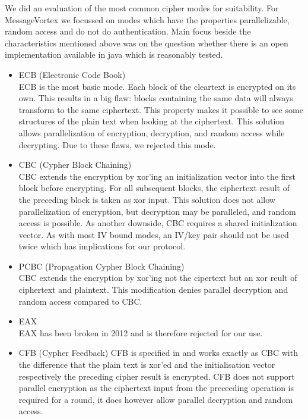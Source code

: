 We did an evaluation of the most common cipher modes for suitability. For MessageVortex we focussed on modes which have the properties parallelizable, random access and do not do authentication. Main focus beside the characteristics mentioned above was on the question whether there is an open implementation available in java which is reasonably tested.

\begin{itemize}
	\item ECB (Electronic Code Book)\\
          ECB is the most basic mode. Each block of the cleartext is encrypted on its own. This results in a big flaw: blocks containing the same data will always transform to the same ciphertext. This property makes it possible to see some structures of the plain text when looking at the ciphertext. This solution allows parallelization of encryption, decryption, and random access while decrypting. Due to these flaws, we rejected this mode.
	\item CBC (Cypher Block Chaining)\\  
          CBC extends the encryption by xor'ing an initialization vector into the first block before encrypting. For all subsequent blocks, the ciphertext result of the preceding block is taken as xor input. This solution does not allow parallelization of encryption, but decryption may be paralleled, and random access is possible. As another downside, CBC requires a shared initialization vector. As with most IV bound modes, an IV/key pair should not be used twice which has implications for our protocol.
	\item PCBC (Propagation Cypher Block Chaining)\\
	      CBC extends the encryption by xor'ing not the cipertext but an xor reult of ciphertext and plaintext. This modification denies parallel decryption and random access compared to CBC.
	\item EAX\\      
	      EAX has been broken in 2012\cite{minematsu2013attacks} and is therefore rejected for our use.
	\item CFB (Cypher Feedback)
	      CFB is specified in \cite{dworkin2001recommendation} and works exactly as CBC with the difference that the plain text is xor'ed and the initialisation vector respectively the preceding cipher result is encrypted. CFB does not support parallel encryption as the ciphertext input from the preceeding operation is required for a round, it does however allow parallel decryption and random access.

\end{itemize}
